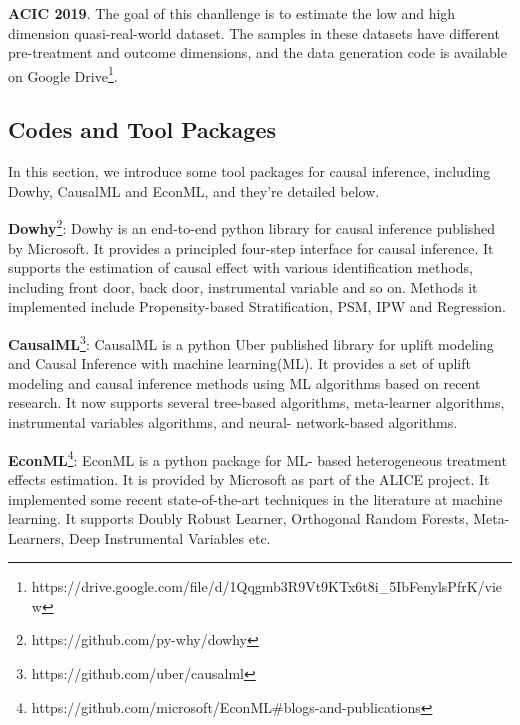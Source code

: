 \textbf{ACIC 2019}.
The goal of this chanllenge is to estimate the low and high dimension quasi-real-world dataset.
The samples in these datasets have different pre-treatment and outcome dimensions, and the data generation code is
available on Google Drive\footnote{https://drive.google.com/file/d/1Qqgmb3R9Vt9KTx6t8i\_5IbFenylsPfrK/view}.

\subsection{Codes and Tool Packages}\label{subsec:codes-and-tool-packages}

In this section, we introduce some tool packages for causal inference, including Dowhy\cite{sharma2020dowhy}, CausalML
and EconML\cite{bach2022doubleml}, and they're detailed below.

\textbf{Dowhy}\footnote{https://github.com/py-why/dowhy}: Dowhy is an end-to-end python library for causal inference
published by Microsoft.
It provides a principled four-step interface for causal inference.
It supports the estimation of causal effect with various identification methods, including front door, back door,
instrumental variable and so on.
Methods it implemented include Propensity-based Stratification, PSM, IPW and Regression.

\textbf{CausalML}\footnote{https://github.com/uber/causalml}: CausalML is a python Uber published library for uplift
modeling and Causal Inference with machine learning(ML).
It provides a set of uplift modeling and causal inference methods using ML algorithms based on recent research.
It now supports several tree-based algorithms, meta-learner algorithms, instrumental variables algorithms, and neural-
network-based algorithms.

\textbf{EconML}\footnote{https://github.com/microsoft/EconML\#blogs-and-publications}: EconML is a python package for ML-
based heterogeneous treatment effects estimation.
It is provided by Microsoft as part of the ALICE project.
It implemented some recent state-of-the-art techniques in the literature at machine learning.
It supports Doubly Robust Learner, Orthogonal Random Forests, Meta-Learners, Deep Instrumental Variables etc.


